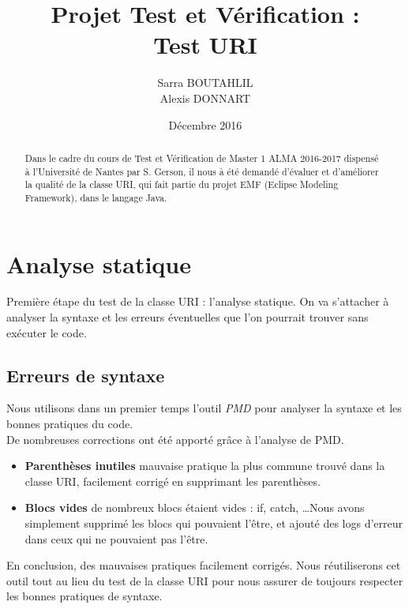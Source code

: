 \documentclass[a4paper,11pt]{article}
\newcommand{\br}{\\\mbox{}}
\begin{document}

\title{\color{red}Projet Test et Vérification : \br\textbf{Test URI}}
\date{Décembre 2016}
\author{Sarra BOUTAHLIL\br Alexis DONNART}

\maketitle

\begin{abstract}
Dans le cadre du cours de Test et Vérification de Master 1 ALMA 2016-2017 dispensé à l'Université de Nantes par S. Gerson, il nous à été demandé d'évaluer et d'améliorer la qualité de la classe URI, qui fait partie du projet EMF (Eclipse Modeling Framework), dans le langage Java.
\end{abstract}
\pagebreak

\tableofcontents


\pagebreak 

\section{Analyse statique}
Première étape du test de la classe URI : l'analyse statique. On va s'attacher à analyser la syntaxe et les erreurs éventuelles que l'on pourrait trouver sans exécuter le code.
\subsection{Erreurs de syntaxe}
Nous utilisons dans un premier temps l'outil \textit{PMD} pour analyser la syntaxe et les bonnes pratiques du code.\br
De nombreuses corrections ont été apporté grâce à l'analyse de PMD.
\begin{itemize}
\item  \textbf{Parenthèses inutiles} mauvaise pratique la plus commune trouvé dans la classe URI, facilement corrigé en supprimant les parenthèses.
\item \textbf{Blocs vides} de nombreux blocs étaient vides : if, catch, \dots Nous avons simplement supprimé les blocs qui pouvaient l'être, et ajouté des logs d'erreur dans ceux qui ne pouvaient pas l'être.
\end{itemize}
En conclusion, des mauvaises pratiques facilement corrigés. Nous réutiliserons cet outil tout au lieu du test de la classe URI pour nous assurer de toujours respecter les bonnes pratiques de syntaxe.
\end{document}
